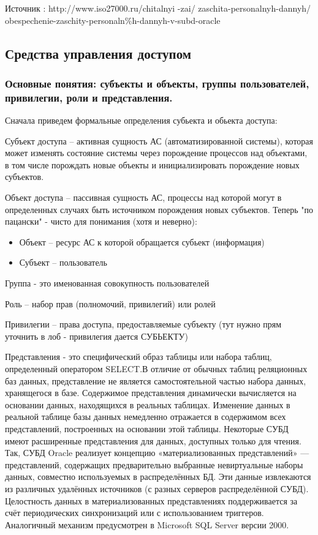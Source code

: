 Источник : http://www.iso27000.ru/chitalnyi
-zai/
zaschita-personalnyh-dannyh/
obespechenie-zaschity-personaln\%h-dannyh-v-subd-oracle
\subsection{Средства управления доступом}
\subsubsection{Основные понятия: субъекты и объекты, группы пользователей, привилегии, роли и представления.}
Сначала приведем формальные определения субьекта и обьекта доступа:

Субъект доступа – активная сущность АС (автоматизированной системы), которая может изменять состояние системы через порождение процессов над объектами, в том числе порождать новые объекты и инициализировать порождение новых субъектов.

Объект доступа – пассивная сущность АС, процессы над которой могут в определенных случаях быть источником порождения новых субъектов.
Теперь "по пацански" - чисто для понимания (хотя и неверно):
\begin{itemize}
    \item Объект – ресурс АС к которой обращается субьект (информация)
    \item Субъект – пользователь
\end{itemize}

Группа - это именованная совокупность пользователей

Роль – набор прав (полномочий, привилегий) или ролей

Привилегии – права доступа, предоставляемые субъекту (тут нужно прям уточнить в лоб - привилегия дается СУБЬЕКТУ)

Представления - это специфический образ таблицы или набора таблиц,
определенный оператором SELECT.В отличие от обычных таблиц реляционных баз данных, представление не является самостоятельной частью набора данных, хранящегося в базе. Содержимое представления динамически вычисляется на основании данных, находящихся в реальных таблицах. Изменение данных в реальной таблице базы данных немедленно отражается в содержимом всех представлений, построенных на основании этой таблицы. Некоторые СУБД имеют расширенные представления для данных, доступных только для чтения. Так, СУБД Oracle реализует концепцию «материализованных представлений» — представлений, содержащих предварительно выбранные невиртуальные наборы данных, совместно используемых в распределённых БД. Эти данные извлекаются из различных удалённых источников (с разных серверов распределённой СУБД). Целостность данных в материализованных представлениях поддерживается за счёт периодических синхронизаций или с использованием триггеров. Аналогичный механизм предусмотрен в Microsoft SQL Server версии 2000.

